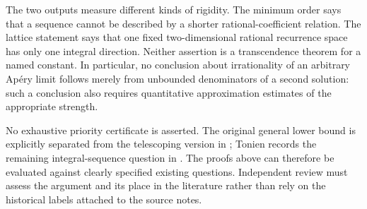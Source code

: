 \documentclass[11pt,a4paper]{article}
\theoremstyle{definition}\newtheorem{definition}[theorem]{Definition}
\theoremstyle{remark}\newtheorem{remark}[theorem]{Remark}
\begin{document}
The two outputs measure different kinds of rigidity. The minimum order says
that a sequence cannot be described by a shorter rational-coefficient relation.
The lattice statement says that one fixed two-dimensional rational recurrence
space has only one integral direction. Neither assertion is a transcendence
theorem for a named constant. In particular, no conclusion about irrationality
of an arbitrary Ap\'ery limit follows merely from unbounded denominators of a
second solution: such a conclusion also requires quantitative approximation
estimates of the appropriate strength.

No exhaustive priority certificate is asserted. The original general lower
bound is explicitly separated from the telescoping version in \cite{SZ};
Tonien records the remaining integral-sequence question in \cite{Tonien}.
The proofs above can therefore be evaluated against clearly specified existing
questions. Independent review must assess the argument and its place in the
literature rather than rely on the historical labels attached to the source
notes.

\appendix
\end{document}
